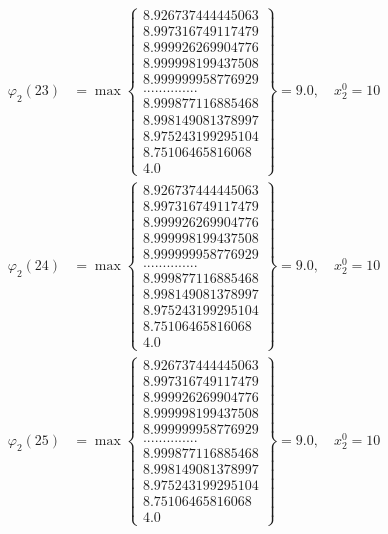 \documentclass{article}
\begin{document}
\begin{align*}
  
  
  
\varphi_{2}(23) &= \max \left\{ \begin{array}{c}
8.926737444445063 \\
 8.997316749117479 \\
 8.999926269904776 \\
 8.999998199437508 \\
 8.999999958776929 \\
 .............. \\
 8.999877116885468 \\
 8.998149081378997 \\
 8.975243199295104 \\
 8.75106465816068 \\
 4.0
\end{array} \right\} = 9.0, \quad x_{2}^0 = 10\\
  
  
  
  
\varphi_{2}(24) &= \max \left\{ \begin{array}{c}
8.926737444445063 \\
 8.997316749117479 \\
 8.999926269904776 \\
 8.999998199437508 \\
 8.999999958776929 \\
 .............. \\
 8.999877116885468 \\
 8.998149081378997 \\
 8.975243199295104 \\
 8.75106465816068 \\
 4.0
\end{array} \right\} = 9.0, \quad x_{2}^0 = 10\\
  
  
  
  
\varphi_{2}(25) &= \max \left\{ \begin{array}{c}
8.926737444445063 \\
 8.997316749117479 \\
 8.999926269904776 \\
 8.999998199437508 \\
 8.999999958776929 \\
 .............. \\
 8.999877116885468 \\
 8.998149081378997 \\
 8.975243199295104 \\
 8.75106465816068 \\
 4.0
\end{array} \right\} = 9.0, \quad x_{2}^0 = 10\\
  

\end{align*}
\end{document}
